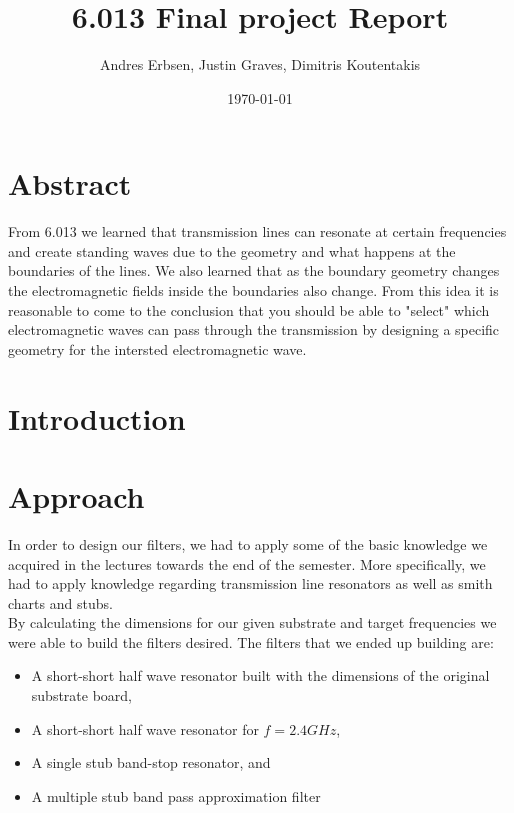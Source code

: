 \documentclass[letterpaper, 12pt]{article}
\begin{document}
\title{6.013 Final project Report}
\author{Andres Erbsen, Justin Graves, Dimitris Koutentakis}
\date{\today}
\maketitle
\vspace{5mm}
\tableofcontents
\clearpage
\section{Abstract}
From 6.013 we learned that transmission lines can resonate at certain frequencies and create standing waves due to the geometry and what happens at the boundaries of the lines. We also learned that as the boundary geometry changes the electromagnetic fields inside the boundaries also change. From this idea it is reasonable to come to the conclusion that you should be able to "select" which electromagnetic waves can pass through the transmission by designing a specific geometry for the intersted electromagnetic wave.

\section {Introduction}
\section{Approach}
In order to design our filters, we had to apply some of the basic knowledge we acquired in the lectures towards the end of the semester. More specifically, we had to apply knowledge regarding transmission line resonators as well as smith charts and stubs.
\\
By calculating the dimensions for our given substrate and target frequencies we were able to build the filters desired. The filters that we ended up building are:
\begin{itemize}
    \item A short-short half wave resonator built with the dimensions of the original substrate board,
    \item A short-short half wave resonator for $f=2.4 GHz$,
    \item A single stub band-stop resonator, and
    \item A multiple stub band pass approximation filter
\end{itemize}
\end{document}
